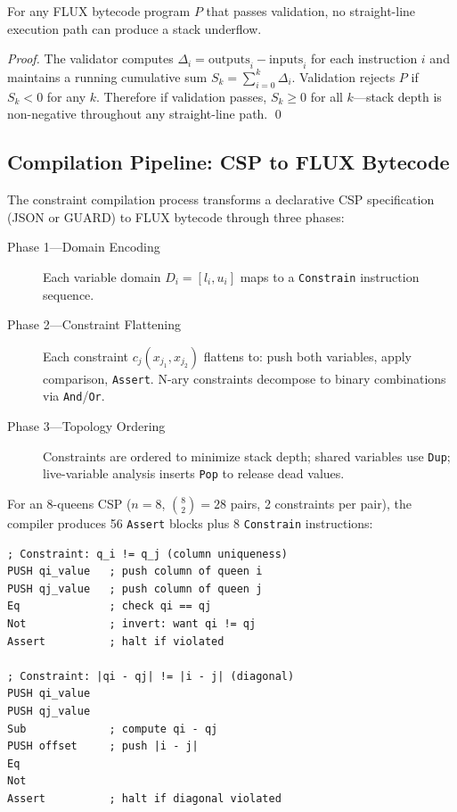 \documentclass[sigplan,10pt,review]{acmart}
\begin{document}
\begin{theorem}
\label{thm:stack}
For any FLUX bytecode program $P$ that passes validation, no straight-line execution
path can produce a stack underflow.
\end{theorem}

\begin{proof}
The validator computes $\Delta_i = \text{outputs}_i - \text{inputs}_i$ for each
instruction $i$ and maintains a running cumulative sum $S_k = \sum_{i=0}^{k} \Delta_i$.
Validation rejects $P$ if $S_k < 0$ for any $k$. Therefore if validation passes,
$S_k \geq 0$ for all $k$---stack depth is non-negative throughout any straight-line
path. \qed
\end{proof}

\subsection{Compilation Pipeline: CSP to FLUX Bytecode}

The constraint compilation process transforms a declarative CSP specification (JSON
or GUARD) to FLUX bytecode through three phases:

\begin{description}
  \item[Phase 1---Domain Encoding] Each variable domain $D_i = [l_i, u_i]$ maps to a
    \texttt{Constrain} instruction sequence.
  \item[Phase 2---Constraint Flattening] Each constraint $c_j(x_{j_1}, x_{j_2})$ flattens
    to: push both variables, apply comparison, \texttt{Assert}. N-ary constraints decompose
    to binary combinations via \texttt{And}/\texttt{Or}.
  \item[Phase 3---Topology Ordering] Constraints are ordered to minimize stack depth;
    shared variables use \texttt{Dup}; live-variable analysis inserts \texttt{Pop} to
    release dead values.
\end{description}

\noindent For an 8-queens CSP ($n=8$, $\binom{8}{2}=28$ pairs, 2 constraints per pair),
the compiler produces 56 \texttt{Assert} blocks plus 8 \texttt{Constrain} instructions:

\begin{lstlisting}[style=rustcode,caption={8-Queens column-uniqueness constraint in FLUX bytecode.},label={lst:queens}]
; Constraint: q_i != q_j (column uniqueness)
PUSH qi_value   ; push column of queen i
PUSH qj_value   ; push column of queen j
Eq              ; check qi == qj
Not             ; invert: want qi != qj
Assert          ; halt if violated

; Constraint: |qi - qj| != |i - j| (diagonal)
PUSH qi_value
PUSH qj_value
Sub             ; compute qi - qj
PUSH offset     ; push |i - j|
Eq
Not
Assert          ; halt if diagonal violated
\end{lstlisting}
\end{document}
